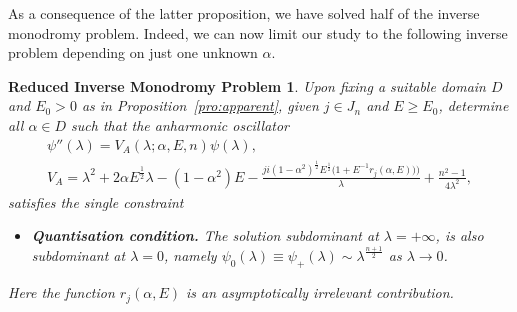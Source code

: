 \documentclass[pdftex]{sigma}
\numberwithin{equation}{section}
\newtheorem*{probinvred*}{Reduced Inverse Monodromy Problem}
\newcommand{\la}{\lambda}
\newcommand{\al}{\alpha}
\begin{document}
As a consequence of the latter proposition, we have solved half of the inverse monodromy problem. Indeed, we can now limit our study to the following inverse problem depending on just one unknown $\al$.
\begin{probinvred*}
	Upon fixing a suitable domain $D$ and $E_0>0$ as in Proposition~{\rm \ref{pro:apparent}}, given $j\in J_n$ and $E\geq E_0$, determine all $\alpha\in D$ such that the anharmonic oscillator
	\begin{gather}\label{eq:h1asym}
	\psi''(\lambda)=V_A\left(\lambda;\alpha,E,n\right)\psi(\lambda), \\
	V_A= \lambda^2+2\al E^{\frac12}\lambda- (1-\al^2)E-\frac{j i (1-\al^2)^{\frac12} E^{\frac12}\big(1+E^{-1} r_j(\al,E))\big)}{\lambda}
	+\frac{n^2-1}{4 \la^2} ,\nonumber
	\end{gather}
	satisfies the single constraint
	\begin{itemize}\itemsep=0pt
\item\textbf{Quantisation condition.} The solution subdominant at $\la=+\infty$, is also subdominant at $\la=0$, namely $\psi_0(\lambda) \equiv \psi_+(\lambda) \sim \la^{\frac{n+1}{2}}$ as $\la \to 0$.
	\end{itemize}
	Here the function $r_j(\al,E)$ is an asymptotically irrelevant contribution.
\end{probinvred*}
\end{document}
